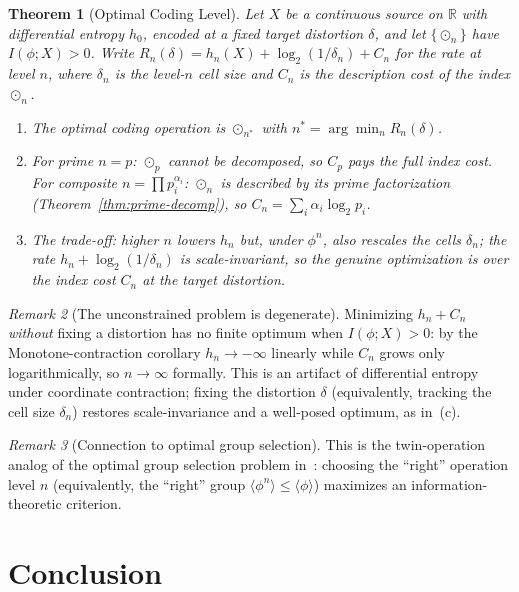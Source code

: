 \documentclass[11pt,twocolumn]{article}
\theoremstyle{plain}
\newtheorem{theorem}{Theorem}
\theoremstyle{definition}
\theoremstyle{remark}
\newtheorem{remark}[theorem]{Remark}
\newcommand{\R}{\mathbb{R}}
\begin{document}
\begin{theorem}[Optimal Coding Level]\label{thm:optimal-level}
Let $X$ be a continuous source on $\R$ with differential entropy $h_0$, encoded at a fixed target distortion $\delta$, and let $\{\odot_n\}$ have $I(\phi;X) > 0$. Write $R_n(\delta) = h_n(X) + \log_2(1/\delta_n) + C_n$ for the rate at level $n$, where $\delta_n$ is the level-$n$ cell size and $C_n$ is the description cost of the index $\odot_n$.
\begin{enumerate}[label=(\alph*)]
    \item The optimal coding operation is $\odot_{n^*}$ with $n^* = \arg\min_n R_n(\delta)$.
    \item For prime $n = p$: $\odot_p$ cannot be decomposed, so $C_p$ pays the full index cost. For composite $n = \prod p_i^{\alpha_i}$: $\odot_n$ is described by its prime factorization (Theorem~\ref{thm:prime-decomp}), so $C_n = \sum_i \alpha_i \log_2 p_i$.
    \item The trade-off: higher $n$ lowers $h_n$ but, under $\phi^n$, also rescales the cells $\delta_n$; the rate $h_n + \log_2(1/\delta_n)$ is scale-invariant, so the genuine optimization is over the index cost $C_n$ at the target distortion.
\end{enumerate}
\end{theorem}

\begin{remark}[The unconstrained problem is degenerate]
Minimizing $h_n + C_n$ \emph{without} fixing a distortion has no finite optimum when $I(\phi;X) > 0$: by the Monotone-contraction corollary $h_n \to -\infty$ linearly while $C_n$ grows only logarithmically, so $n \to \infty$ formally. This is an artifact of differential entropy under coordinate contraction; fixing the distortion $\delta$ (equivalently, tracking the cell size $\delta_n$) restores scale-invariance and a well-posed optimum, as in~(c).
\end{remark}

\begin{remark}[Connection to optimal group selection]
This is the twin-operation analog of the optimal group selection problem in~\cite{nembe2026a2}: choosing the ``right'' operation level $n$ (equivalently, the ``right'' group $\langle\phi^n\rangle \leq \langle\phi\rangle$) maximizes an information-theoretic criterion.
\end{remark}


\section{Conclusion}
\label{sec:conclusion}
\end{document}

